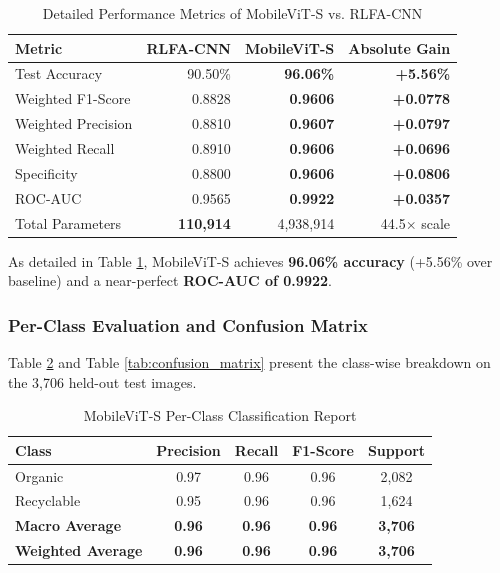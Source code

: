 \documentclass[conference]{IEEEtran}
\begin{document}
\begin{table}[htbp]
\caption{Detailed Performance Metrics of MobileViT-S vs. RLFA-CNN}
\label{tab:mobilevit_results}
\centering
\begin{tabular}{@{}lrrr@{}}
\toprule
\textbf{Metric} & \textbf{RLFA-CNN} & \textbf{MobileViT-S} & \textbf{Absolute Gain} \\ \midrule
Test Accuracy & 90.50\% & \textbf{96.06\%} & \textbf{+5.56\%} \\
Weighted F1-Score & 0.8828 & \textbf{0.9606} & \textbf{+0.0778} \\
Weighted Precision & 0.8810 & \textbf{0.9607} & \textbf{+0.0797} \\
Weighted Recall & 0.8910 & \textbf{0.9606} & \textbf{+0.0696} \\
Specificity & 0.8800 & \textbf{0.9606} & \textbf{+0.0806} \\
ROC-AUC & 0.9565 & \textbf{0.9922} & \textbf{+0.0357} \\
Total Parameters & \textbf{110,914} & 4,938,914 & 44.5$\times$ scale \\ \bottomrule
\end{tabular}
\end{table}

As detailed in Table \ref{tab:mobilevit_results}, MobileViT-S achieves \textbf{96.06\% accuracy} (+5.56\% over baseline) and a near-perfect \textbf{ROC-AUC of 0.9922}. 

\subsubsection{Per-Class Evaluation and Confusion Matrix}
Table \ref{tab:per_class} and Table \ref{tab:confusion_matrix} present the class-wise breakdown on the 3,706 held-out test images.

\begin{table}[htbp]
\caption{MobileViT-S Per-Class Classification Report}
\label{tab:per_class}
\centering
\begin{tabular}{@{}lcccc@{}}
\toprule
\textbf{Class} & \textbf{Precision} & \textbf{Recall} & \textbf{F1-Score} & \textbf{Support} \\ \midrule
Organic & 0.97 & 0.96 & 0.96 & 2,082 \\
Recyclable & 0.95 & 0.96 & 0.96 & 1,624 \\ \midrule
\textbf{Macro Average} & \textbf{0.96} & \textbf{0.96} & \textbf{0.96} & \textbf{3,706} \\
\textbf{Weighted Average} & \textbf{0.96} & \textbf{0.96} & \textbf{0.96} & \textbf{3,706} \\ \bottomrule
\end{tabular}
\end{table}
\end{document}
